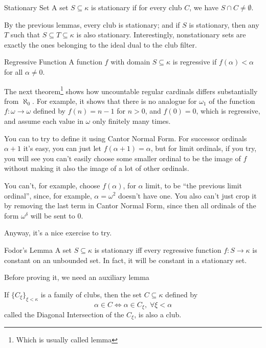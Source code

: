 \begin{definition}{Stationary Set}{}
    A set $S\subseteq\kappa$ is \textcolor{laser_eyes!80!black}{stationary} if for every club $C$, we have $S\cap C\neq\emptyset$.
\end{definition}

By the previous lemmas, every club is stationary; and if $S$ is stationary, then any $T$ such that $S\subseteq T\subseteq\kappa$ is also stationary. Interestingly, nonstationary sets are exactly the ones belonging to the ideal dual to the club filter.

\begin{definition}{Regressive Function}{}
    A function $f$ with domain $S\subseteq\kappa$ is \textcolor{laser_eyes!80!black}{regressive} if $f(\alpha)<\alpha$ for all $\alpha\neq0$.
\end{definition}

The next theorem\footnote{Which is usually called lemma} shows how uncountable regular cardinals differs substantially from $\aleph_0$. For example, it shows that there is no analogue for $\omega_1$ of the function $f:\omega\to\omega$ defined by $f(n)=n-1$ for $n>0$, and $f(0)=0$, which is regressive, and assume each value in $\omega$ only finitely many times.

You can to try to define it using Cantor Normal Form. For successor ordinals $\alpha+1$ it's easy, you can just let $f(\alpha+1)=\alpha$, but for limit ordinals, if you try, you will see you can't easily choose some smaller ordinal to be the image of $f$ without making it also the image of a lot of other ordinals.

You can't, for example, choose $f(\alpha)$, for $\alpha$ limit, to be ``the previous limit ordinal'', since, for example, $\alpha=\omega^2$ doesn't have one. You also can't just crop it by removing the last term in Cantor Normal Form, since then all ordinals of the form $\omega^\delta$ will be sent to $0$.

Anyway, it's a nice exercise to try.

\begin{theorem}{Fodor's Lemma}{}
    A set $S\subseteq\kappa$ is stationary iff every regressive function $f:S\to\kappa$ is constant on an unbounded set. In fact, it will be constant in a stationary set.
\end{theorem}

Before proving it, we need an auxiliary lemma

\begin{lemma}{}{}
    If $\{C_\xi\}_{\xi<\kappa}$ is a family of clubs, then the set $C\subseteq\kappa$ defined by
    $$\alpha\in C\iff \alpha\in C_\xi,\;\forall \xi<\alpha$$
    called the \textcolor{laser_eyes!80!black}{Diagonal Intersection} of the $C_\xi$, is also a club.
\end{lemma}

